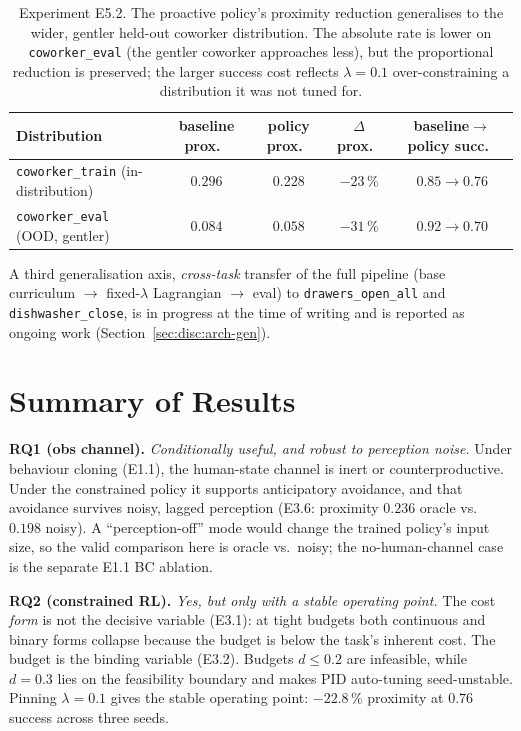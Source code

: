 \documentclass[11pt,a4paper]{report}
\begin{document}
\begin{table}[h]
\centering
\caption{Experiment E5.2. The proactive policy's proximity reduction
generalises to the wider, gentler held-out coworker distribution. The
absolute rate is lower on \texttt{coworker\_eval} (the gentler
coworker approaches less), but the proportional reduction is
preserved; the larger success cost reflects $\lambda = 0.1$
over-constraining a distribution it was not tuned for.}
\label{tab:e5.2-ood}
\small
\begin{tabular}{lcccc}
\toprule
Distribution & baseline prox.\ & policy prox.\ & $\Delta$ prox.\ & baseline$\to$policy succ.\ \\
\midrule
\texttt{coworker\_train} (in-distribution) & $0.296$ & $0.228$ & $-23\,\%$ & $0.85 \to 0.76$ \\
\texttt{coworker\_eval} (OOD, gentler)     & $0.084$ & $0.058$ & $-31\,\%$ & $0.92 \to 0.70$ \\
\bottomrule
\end{tabular}
\end{table}

A third generalisation axis, \emph{cross-task} transfer of the full
pipeline (base curriculum $\rightarrow$ fixed-$\lambda$ Lagrangian
$\rightarrow$ eval) to \texttt{drawers\_open\_all} and
\texttt{dishwasher\_close}, is in progress at the time of writing and
is reported as ongoing work (Section~\ref{sec:disc:arch-gen}).

\section{Summary of Results}
\label{sec:results:summary}

\textbf{RQ1 (obs channel).} \emph{Conditionally useful, and robust to
perception noise.} Under behaviour cloning (E1.1), the human-state
channel is inert or counterproductive. Under the constrained policy it
supports anticipatory avoidance, and that avoidance survives noisy,
lagged perception (E3.6: proximity $0.236$ oracle vs.\ $0.198$ noisy).
A ``perception-off'' mode would change the trained policy's input size,
so the valid comparison here is oracle vs.\ noisy; the no-human-channel
case is the separate E1.1 BC ablation.

\textbf{RQ2 (constrained RL).} \emph{Yes, but only with a stable
operating point.} The cost \emph{form} is not the decisive variable
(E3.1): at tight budgets both continuous and binary forms collapse
because the budget is below the task's inherent cost. The budget is the
binding variable (E3.2). Budgets $d \le 0.2$ are infeasible, while
$d = 0.3$ lies on the feasibility boundary and makes PID
auto-tuning seed-unstable. Pinning $\lambda = 0.1$ gives the stable
operating point: $-22.8\,\%$ proximity at $0.76$ success across three
seeds.
\end{document}
